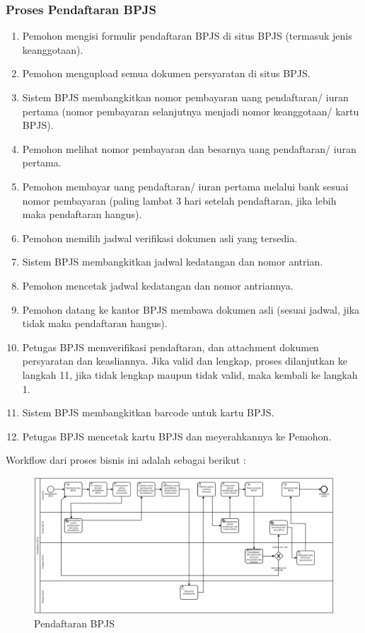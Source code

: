 \subsubsection{Proses Pendaftaran BPJS}
\begin{enumerate}
	\item Pemohon mengisi formulir pendaftaran BPJS di situs BPJS (termasuk jenis keanggotaan).
	\item Pemohon mengupload semua dokumen persyaratan di situs BPJS.
	\item Sistem BPJS membangkitkan nomor pembayaran uang pendaftaran/ iuran pertama (nomor pembayaran selanjutnya menjadi nomor keanggotaan/ kartu BPJS).
  \item Pemohon melihat nomor pembayaran dan besarnya uang pendaftaran/ iuran pertama.
  \item Pemohon membayar uang pendaftaran/ iuran pertama melalui bank sesuai nomor pembayaran (paling lambat 3 hari setelah pendaftaran, jika lebih maka pendaftaran hangus).
  \item Pemohon memilih jadwal verifikasi dokumen asli yang tersedia.
  \item Sistem BPJS membangkitkan jadwal kedatangan dan nomor antrian.
  \item Pemohon mencetak jadwal kedatangan dan nomor antriannya.
  \item Pemohon datang ke kantor BPJS membawa dokumen asli (sesuai jadwal, jika tidak maka pendaftaran hangus). 
  \item Petugas BPJS memverifikasi pendaftaran, dan attachment dokumen persyaratan dan keasliannya. Jika valid dan lengkap, proses dilanjutkan ke langkah 11, jika tidak lengkap maupun tidak valid, maka kembali ke langkah 1.
	\item Sistem BPJS membangkitkan barcode untuk kartu BPJS.
  \item Petugas BPJS mencetak kartu BPJS dan meyerahkannya ke Pemohon.
\end{enumerate}
Workflow dari proses bisnis ini adalah sebagai berikut :
		
		\begin{figure}[H]
			\centering
			\includegraphics[scale=0.5]{Gambar/Bab-3/Kasus2-4}
			\caption{Pendaftaran BPJS} 
			\label{fig:mengunggahproposalgroup}
		\end{figure}






